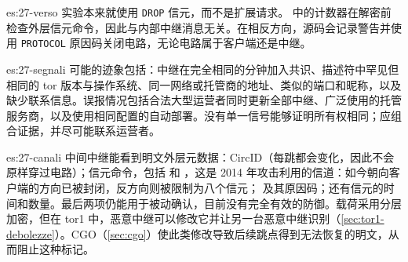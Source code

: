 \begin{soluzione}{es:27-verso}
实验本来就使用 \texttt{DROP} 信元，而不是扩展请求。 中的计数器在解密前检查外层信元命令，因此与内部中继消息无关。在相反方向，源码会记录警告并使用 \texttt{PROTOCOL} 原因码关闭电路，无论电路属于客户端还是中继。
\end{soluzione}

\begin{soluzione}{es:27-segnali}
可能的迹象包括：中继在完全相同的分钟加入共识、描述符中罕见但相同的 tor 版本与操作系统、同一网络或托管商的地址、类似的端口和昵称，以及缺少联系信息。误报情况包括合法大型运营者同时更新全部中继、广泛使用的托管服务商，以及使用相同配置的自动部署。没有单一信号能够证明所有权相同；应组合证据，并尽可能联系运营者。
\end{soluzione}

\begin{soluzione}{es:27-canali}
中间中继能看到明文外层元数据：CircID（每跳都会变化，因此不会原样穿过电路）；信元命令，包括  和 ，这是 2014 年攻击利用的信道：如今朝向客户端的方向已被封闭，反方向则被限制为八个信元； 及其原因码；还有信元的时间和数量。最后两项仍能用于被动确认，目前没有完全有效的防御。载荷采用分层加密，但在 tor1 中，恶意中继可以修改它并让另一台恶意中继识别（\cref{sec:tor1-debolezze}）。CGO（\cref{sec:cgo}）使此类修改导致后续跳点得到无法恢复的明文，从而阻止这种标记。
\end{soluzione}
